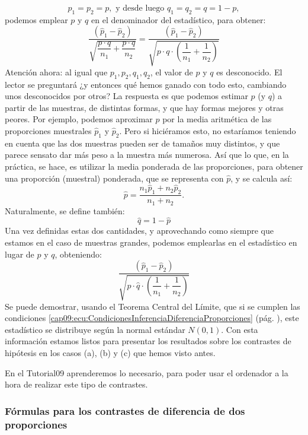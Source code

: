 \[p_1=p_2=p, \mbox{ y desde luego }q_1=q_2=q=1-p,\]
podemos emplear $p$ y $q$ en el denominador del estadístico, para obtener:
    \[
        \dfrac{\left(\hat p_1-\hat p_2\right)}{\sqrt{\dfrac{p\cdot q}{n_1}+\dfrac{p\cdot
        q}{n_2}}}=
        \dfrac{\left(\hat p_1-\hat p_2\right)}{\sqrt{p\cdot q \cdot\left(\dfrac{1}{n_1}+\dfrac{1}{n_2}\right)}}
    \]
Atención ahora: al igual que $p_1, p_2, q_1, q_2$, el valor de $p$ y $q$ es desconocido. El lector se preguntará ¿y entonces qué hemos ganado con todo esto, cambiando unos desconocidos por otros? La respuesta es que podemos estimar $p$ (y $q$) a partir de las muestras, de distintas formas, y que hay formas mejores y otras peores. Por ejemplo, podemos aproximar $p$ por la media aritmética de las proporciones muestrales $\hat p_1$ y $\hat p_2$. Pero si hiciéramos esto, no estaríamos teniendo en cuenta que las dos muestras pueden ser de tamaños muy distintos, y que parece sensato dar más peso a la muestra más numerosa. Así que lo que, en la práctica, se hace, es utilizar la  media ponderada de las proporciones, para obtener una {\sf proporción (muestral)  ponderada}, que se representa con $\hat p$, y se calcula así:
\[\hat p=\dfrac{n_1\hat p_1+n_2\hat p_2}{n_1+n_2}.\]
Naturalmente, se define también:
\[\hat q=1-\hat p\]
Una vez definidas estas dos cantidades, y aprovechando como siempre que estamos en el caso de muestras grandes, podemos emplearlas en el estadístico en lugar de $p$ y $q$, obteniendo:
    \[
        \dfrac{\left(\hat p_1-\hat p_2\right)}{\sqrt{\hat p\cdot \hat q \cdot\left(\dfrac{1}{n_1}+\dfrac{1}{n_2}\right)}}
    \]
Se puede demostrar, usando el Teorema Central del Límite, que si se cumplen las condiciones \ref{cap09:ecu:CondicionesInferenciaDiferenciaProporciones} (pág. \pageref{cap09:ecu:CondicionesInferenciaDiferenciaProporciones}), este estadístico se distribuye según la normal estándar $N(0,1)$. Con esta información estamos listos para presentar los resultados sobre los contrastes de hipótesis en los casos (a), (b) y (c) que hemos visto antes.

En el Tutorial09 aprenderemos lo necesario, para poder usar el ordenador a la hora de realizar este
tipo de contrastes.

\subsubsection{Fórmulas para los contrastes de diferencia de dos proporciones}
\label{cap09:subsubsec:FormulasContrastesDiferencia2Proporciones}

